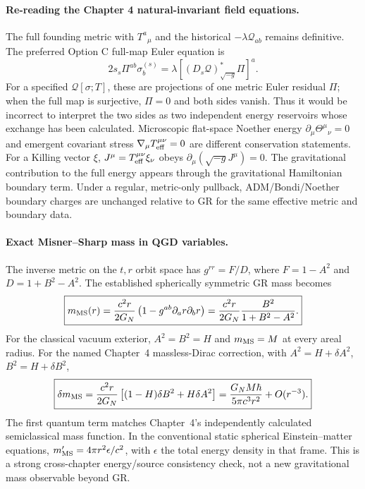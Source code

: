 \documentclass[11pt,a4paper]{article}
\theoremstyle{definition}\newtheorem{definition}[theorem]{Definition}
\theoremstyle{remark}\newtheorem{remark}[theorem]{Remark}
\begin{document}
\paragraph{Re-reading the Chapter 4 natural-invariant field equations.}
The full founding metric with $T^a{}_{\mu}$ and the historical
$-\lambda\mathcal Q_{ab}$ remains definitive. The preferred Option C
full-map Euler equation is
\begin{equation}\label{eq:v14-optionC}
\boxed{2s_s\Pi^{ab}\sigma_b^{(s)}
=\lambda[(D_s\mathcal Q)^*_{\sqrt{-g}}\Pi]^a.}
\end{equation}
For a specified $\mathcal Q[\sigma;T]$, these are projections of
one metric Euler residual $\Pi$; when the full map is surjective,
$\Pi=0$ and both sides vanish. Thus it would be incorrect to interpret
the two sides as two independent energy reservoirs whose exchange has
been calculated. Microscopic flat-space Noether energy
$\partial_\mu\Theta^\mu{}_{\nu}=0$ and emergent covariant stress
$\nabla_\mu T_{\rm eff}^{\mu\nu}=0$ are different conservation
statements. For a Killing vector $\xi$,
$J^\mu=T_{\rm eff}^{\mu\nu}\xi_\nu$ obeys
$\partial_\mu(\sqrt{-g}J^\mu)=0$.
The gravitational contribution to the full energy appears through
the gravitational Hamiltonian boundary term. Under a regular,
metric-only pullback, ADM/Bondi/Noether boundary charges are unchanged
relative to GR for the same effective metric and boundary data.

\paragraph{Exact Misner--Sharp mass in QGD variables.}
The inverse metric on the $t,r$ orbit space has
$g^{rr}=F/D$, where $F=1-A^2$ and $D=1+B^2-A^2$.
The established spherically symmetric GR mass becomes
\begin{equation}\label{eq:v14-ms}
\boxed{m_{\rm MS}(r)=\frac{c^2r}{2G_N}
\left(1-g^{ab}\partial_a r\partial_b r\right)
=\frac{c^2r}{2G_N}\frac{B^2}{1+B^2-A^2}.}
\end{equation}
For the classical vacuum exterior, $A^2=B^2=H$ and
$m_{\rm MS}=M$ at every areal radius. For the named Chapter~4
massless-Dirac correction, with $A^2=H+\delta A^2$,
$B^2=H+\delta B^2$,
\begin{equation}\label{eq:v14-msquantum}
\boxed{\delta m_{\rm MS}
=\frac{c^2r}{2G_N}\left[(1-H)\delta B^2+H\delta A^2\right]
=\frac{G_NM\hbar}{5\pi c^3r^2}+O(r^{-3}).}
\end{equation}
The first quantum term matches Chapter~4's independently
calculated semiclassical mass function. In the conventional
static spherical Einstein--matter equations,
$m_{\rm MS}'=4\pi r^2\epsilon/c^2$, with $\epsilon$ the total
energy density in that frame. This is a strong cross-chapter
energy/source consistency check, not a new gravitational mass
observable beyond GR.
\end{document}
